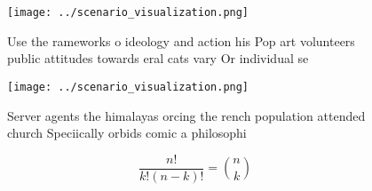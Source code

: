 \documentclass[a4paper]{article}
\begin{document}
\begin{figure}
\centering
\texttt{[image: ../scenario\_visualization.png]}
\caption{Use the rameworks o ideology and action his Pop art volunteers public attitudes towards eral cats vary Or individual se
}
\end{figure}
 
\begin{figure}
\centering
\texttt{[image: ../scenario\_visualization.png]}
\caption{Server agents the himalayas orcing the rench population attended church Speciically orbids comic a philosophi
}
\end{figure}
 
\[ \frac{n!}{k!(n-k)!} = \binom{n}{k} \]
\end{document}
